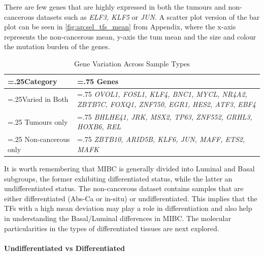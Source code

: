 There are few genes that are highly expressed in both the tumours and non-cancerous datasets such as \textit{ELF3, KLF5} or \textit{JUN}. A scatter plot version of the bar plot can be seen in \cref{fig:ap:sel_tfs_mean} from Appendix, where the x-axis represents the non-cancerous mean, y-axis the tum mean and the size and colour the mutation burden of the genes.

\begin{table}[H]
  \centering
  \begin{tabularx}{\textwidth}{>{\hsize=.25\hsize}X|>{\hsize=.75\hsize}X}
    \toprule
    \textbf{Category} & \textbf{Genes} \\
    \midrule
    Varied in Both & \textit{OVOL1, FOSL1, KLF4, BNC1, MYCL, NR4A2, ZBTB7C, FOXQ1, ZNF750, EGR1, HES2, ATF3, EBF4} \\
    \midrule
    Tumours only & \textit{BHLHE41, JRK, MSX2, TP63, ZNF552, GRHL3, HOXB6, REL} \\
    \midrule
    Non-cancerous only & \textit{ZBTB10, ARID5B, KLF6, JUN, MAFF, ETS2, MAFK} \\
    \bottomrule
  \end{tabularx}
    \caption{Gene Variation Across Sample Types} %
    \label{tab:N_I:sel_tfs_var}
\end{table}


It is worth remembering that MIBC is generally divided into Luminal and Basal subgroups, the former exhibiting differentiated status, while the latter an undifferentiated status. The non-cancerous dataset contains samples that are either differentiated (Abs-Ca or in-situ) or undifferentiated. This implies that the TFs with a high mean deviation may play a role in differentiation and also help in understanding the Basal/Luminal differences in MIBC. The molecular particularities in the types of differentiated tissues are next explored.

\paragraph*{Undifferentiated vs Differentiated} 

